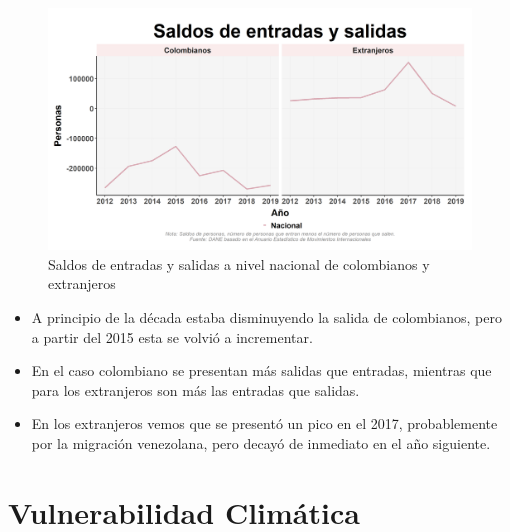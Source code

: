     \begin{figure}[H]
        \caption{Saldos de entradas y salidas a nivel nacional de colombianos y extranjeros \label{map_result_2} }
        \begin{center}
        \includegraphics[width=\textwidth,keepaspectratio]{img/var_237_trend.png}
        \end{center}
    \end{figure}
            \begin{itemize}
                    \item A principio de la década estaba disminuyendo la salida de colombianos, pero a partir del 2015 esta se volvió a incrementar.
                    \item En el caso colombiano se presentan más salidas que entradas, mientras que para los extranjeros son más las entradas que salidas.
                    \item En los extranjeros vemos que se presentó un pico en el 2017, probablemente por la migración venezolana, pero decayó de inmediato en el año siguiente.
                    \end{itemize}

\section{Vulnerabilidad Climática}

